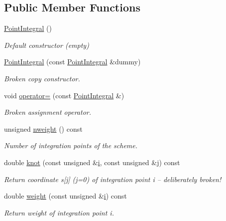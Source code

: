 \subsection*{Public Member Functions}
\begin{DoxyCompactItemize}
\item 
\hyperlink{classoomph_1_1PointIntegral_aa8a362528e1277b2a4f01081f3b26a51}{Point\+Integral} ()
\begin{DoxyCompactList}\small\item\em Default constructor (empty) \end{DoxyCompactList}\item 
\hyperlink{classoomph_1_1PointIntegral_a68ec55f1353da24494a66fa827192b1d}{Point\+Integral} (const \hyperlink{classoomph_1_1PointIntegral}{Point\+Integral} \&dummy)
\begin{DoxyCompactList}\small\item\em Broken copy constructor. \end{DoxyCompactList}\item 
void \hyperlink{classoomph_1_1PointIntegral_afcfb6e758b53260c11ba7d2f40f017c5}{operator=} (const \hyperlink{classoomph_1_1PointIntegral}{Point\+Integral} \&)
\begin{DoxyCompactList}\small\item\em Broken assignment operator. \end{DoxyCompactList}\item 
unsigned \hyperlink{classoomph_1_1PointIntegral_a198be650fefe8cd6bdf50bb848c3896e}{nweight} () const
\begin{DoxyCompactList}\small\item\em Number of integration points of the scheme. \end{DoxyCompactList}\item 
double \hyperlink{classoomph_1_1PointIntegral_a0500dd69b4cfdd2539e2cefb82acb7cf}{knot} (const unsigned \&\hyperlink{cfortran_8h_adb50e893b86b3e55e751a42eab3cba82}{i}, const unsigned \&j) const
\begin{DoxyCompactList}\small\item\em Return coordinate s\mbox{[}j\mbox{]} (j=0) of integration point i -- deliberately broken! \end{DoxyCompactList}\item 
double \hyperlink{classoomph_1_1PointIntegral_a80fc2a944504d8630f68df99aae624ab}{weight} (const unsigned \&\hyperlink{cfortran_8h_adb50e893b86b3e55e751a42eab3cba82}{i}) const
\begin{DoxyCompactList}\small\item\em Return weight of integration point i. \end{DoxyCompactList}\end{DoxyCompactItemize}


